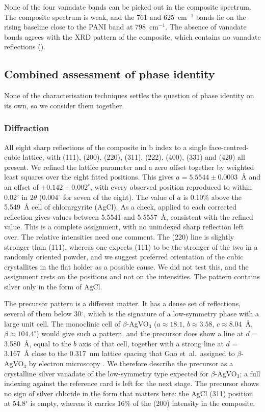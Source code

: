 \documentclass[preprint,11pt]{elsarticle}
\begin{document}
None of the four vanadate bands can be picked out in the composite spectrum. The composite spectrum is weak, and the 761 and 625~cm$^{-1}$ bands lie on the rising baseline close to the PANI band at 798~cm$^{-1}$. The absence of vanadate bands agrees with the XRD pattern of the composite, which contains no vanadate reflections ().

\subsection{Combined assessment of phase identity}
\label{sec:phase}

None of the characterisation techniques settles the question of phase identity on its own, so we consider them together.

\subsubsection{Diffraction}
All eight sharp reflections of the composite in b index to a single face-centred-cubic lattice, with (111), (200), (220), (311), (222), (400), (331) and (420) all present. We refined the lattice parameter and a zero offset together by weighted least squares over the eight fitted positions. This gives $a = 5.5544 \pm 0.0003$~\AA{} and an offset of $+0.142 \pm 0.002^{\circ}$, with every observed position reproduced to within 0.02$^{\circ}$ in 2$\theta$ (0.004$^{\circ}$ for seven of the eight). The value of $a$ is 0.10\% above the 5.549~\AA{} cell of chlorargyrite (AgCl). As a check,  applied to each corrected reflection gives values between 5.5541 and 5.5557~\AA, consistent with the refined value. This is a complete assignment, with no unindexed sharp reflection left over. The relative intensities need one comment. The (220) line is slightly stronger than (111), whereas one expects (111) to be the stronger of the two in a randomly oriented powder, and we suggest preferred orientation of the cubic crystallites in the flat holder as a possible cause. We did not test this, and the assignment rests on the positions and not on the intensities. The pattern contains silver only in the form of AgCl.

The precursor pattern is a different matter. It has a dense set of reflections, several of them below 30$^{\circ}$, which is the signature of a low-symmetry phase with a large unit cell. The monoclinic cell of $\beta$-AgVO$_3$ ($a \approx 18.1$, $b \approx 3.58$, $c \approx 8.04$~\AA, $\beta \approx 104.4^{\circ}$) \cite{menezes2019agvo3} would give such a pattern, and the precursor does show a line at $d$ = 3.580~\AA, equal to the $b$ axis of that cell, together with a strong line at $d$ = 3.167~\AA{} close to the 0.317~nm lattice spacing that Gao et~al.\ assigned to $\beta$-AgVO$_3$ by electron microscopy \cite{gao2017ag3vo4agvo3}. We therefore describe the precursor as a crystalline silver vanadate of the low-symmetry type expected for $\beta$-AgVO$_3$; a full indexing against the reference card is left for the next stage. The precursor shows no sign of silver chloride in the form that matters here: the AgCl (311) position at 54.8$^{\circ}$ is empty, whereas it carries 16\% of the (200) intensity in the composite.
\end{document}
